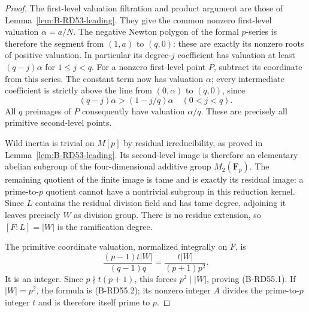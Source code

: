 \begin{proof}
The first-level valuation filtration and product argument are
those of Lemma~\ref{lem:B-RD53-leading}. They give the common
nonzero first-level valuation $\alpha=a/N$.
The negative Newton polygon of the formal $p$-series is therefore
the segment from $(1,a)$ to $(q,0)$: these are exactly its
nonzero roots of positive valuation. In particular its degree-$j$
coefficient has valuation at least $(q-j)\alpha$ for $1\le j<q$.
For a nonzero first-level point $P$, subtract its coordinate
from this series. The constant term now has valuation $\alpha$;
every intermediate coefficient is strictly above the line
from $(0,\alpha)$ to $(q,0)$, since
\[
               (q-j)\alpha>(1-j/q)\alpha\quad(0<j<q).
\]
All $q$ preimages of $P$ consequently have valuation
$\alpha/q$. These are precisely all primitive second-level points.

Wild inertia is trivial on $M[p]$ by residual irreducibility,
as proved in Lemma~\ref{lem:B-RD53-leading}. Its second-level
image is therefore an elementary abelian subgroup of the
four-dimensional additive group $M_2(\mathbf F_p)$.
The remaining quotient of the finite image is tame and is
exactly its residual image: a prime-to-$p$ quotient cannot
have a nontrivial subgroup in this reduction kernel.
Since $L$ contains the residual division field and has tame
degree, adjoining it leaves precisely $W$ as division group.
There is no residue extension, so $[F:L]=|W|$ is the
ramification degree.

The primitive coordinate valuation, normalized integrally on
$F$, is
\[
             \frac{(p-1)t|W|}{(q-1)q}
                  =\frac{t|W|}{(p+1)p^2}.
\]
It is an integer. Since $p\nmid t(p+1)$, this forces
$p^2\mid |W|$, proving (B-RD55.1). If $|W|=p^2$, the formula
is (B-RD55.2); its nonzero integer $A$ divides the prime-to-$p$
integer $t$ and is therefore itself prime to $p$.
\end{proof}

